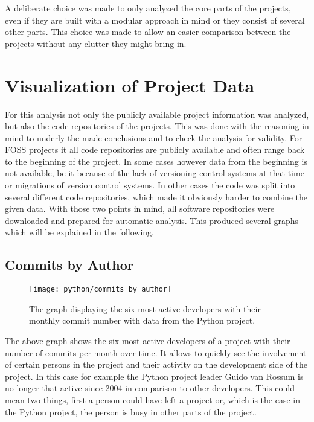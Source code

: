 A deliberate choice was made to only analyzed the core parts of the projects,
even if they are built with a modular approach in mind or they consist of
several other parts. This choice was made to allow an easier comparison between
the projects without any clutter they might bring in.


\section{Visualization of Project Data} %

For this analysis not only the publicly available project information was
analyzed, but also the code repositories of the projects. This was done with
the reasoning in mind to underly the made conclusions and to check the analysis
for validity. For \ac{FOSS} projects it all code repositories are publicly
available and often range back to the beginning of the project. In some cases
however data from the beginning is not available, be it because of the lack of
versioning control systems at that time or migrations of version control
systems. In other cases the code was split into several different code
repositories, which made it obviously harder to combine the given data. With
those two points in mind, all software repositories were downloaded and
prepared for automatic analysis. This produced several graphs which will be
explained in the following.

\subsection{Commits by Author} %

\begin{figure}[h!]
  \centering
  \texttt{[image: python/commits\_by\_author]}
  \caption{The graph displaying the six most active developers with their
  monthly commit number with data from the Python project.}
\end{figure}

The above graph shows the six most active developers of a project with their
number of commits per month over time. It allows to quickly see the involvement
of certain persons in the project and their activity on the development side of
the project. In this case for example the Python project leader Guido van
Rossum is no longer that active since 2004 in comparison to other developers.
This could mean two things, first a person could have left a project or, which
is the case in the Python project, the person is busy in other parts of the
project.

